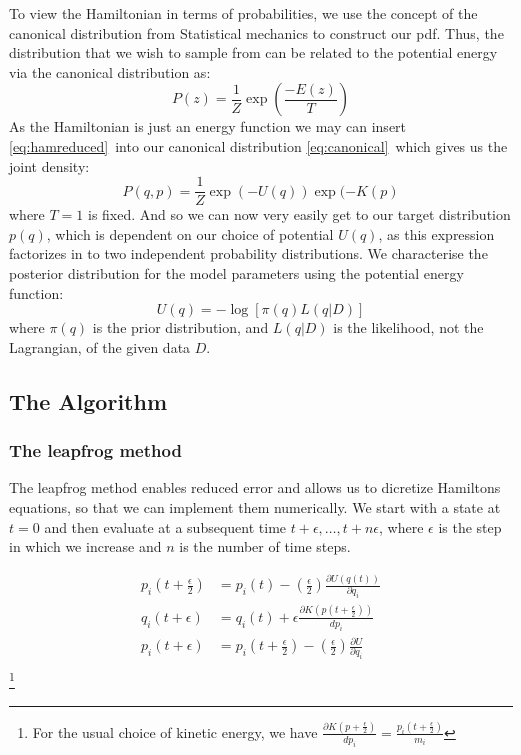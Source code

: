 \documentclass[]{report}
\begin{document}
To view the Hamiltonian in terms of probabilities, we use the concept of the canonical distribution from Statistical mechanics to construct our pdf. Thus, the distribution that we wish to sample from can be related to the potential energy via the canonical distribution as:
\begin{equation}
\label{eq:canonical}
P(z) = \frac{1}{Z}\exp\left(\frac{-E(z)}{T}\right)
\end{equation}
As the Hamiltonian is just an energy function we may can insert \ref{eq:hamreduced}\ into our canonical distribution \ref{eq:canonical}\, which gives us the joint density:
\begin{equation}
P(q,p) = \frac{1}{Z}\exp(-U(q))\exp(-K(p)  
\end{equation}
where $T = 1$ is fixed. And so we can now very easily get to our target distribution $p(q)$, which is dependent on our choice of potential $U(q)$, as this expression factorizes in to two independent probability distributions. 
We characterise the posterior distribution for the model parameters using the potential energy function: \begin{equation}
U(q) = -\log[\pi(q)L(q|D)]
\end{equation}
where $\pi(q)$ is the prior distribution, and $L(q|D)$ is the likelihood, not the Lagrangian, of the given data $D$. 

\subsection{The Algorithm}

\subsubsection{The leapfrog method}
The leapfrog method enables reduced error and allows us to dicretize Hamiltons equations, so that we can implement them numerically. 
We start with a state at $t = 0$ and then evaluate at a subsequent time $t + \epsilon , \hdots, t + n\epsilon$, where $\epsilon$ is the step in which we increase and $n$ is the number of time steps. 

\begin{align}
p_{i}(t + \frac{\epsilon}{2}) &= p_{i}(t) - \left(\frac{\epsilon}{2}\right)\frac{\partial U(q(t))}{\partial q_{i}} \\
q_{i}(t + \epsilon) &= q_{i}(t) + \epsilon\frac{\partial K(p(t + \frac{\epsilon}{2}))}{dp_{i}}\\
p_{i}(t + \epsilon) &= p_{i}(t + \frac{\epsilon}{2}) - \left(\frac{\epsilon}{2}\right)\frac{\partial U}{\partial q_{i}}\\
\end{align}
\footnote{For the usual choice of kinetic energy, we have $\frac{\partial K(p + \frac{\epsilon}{2})}{dp_{i}} = \frac{p_{i}(t + \frac{\epsilon}{2})}{m_{i}}$}
\end{document}

